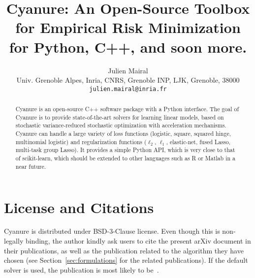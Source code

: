 \documentclass{article}
\title{Cyanure: An Open-Source Toolbox for Empirical Risk Minimization 
for Python, C++, and soon more.
}
\author{
Julien Mairal \\
   {Univ. Grenoble Alpes, Inria, CNRS, Grenoble INP, LJK, Grenoble, 38000}\\
         \texttt{julien.mairal@inria.fr}}
\begin{document}
\maketitle

\begin{abstract}
   Cyanure is an open-source C++ software package with a Python interface. 
   The goal of Cyanure is to provide state-of-the-art solvers for learning linear models,
   based on stochastic variance-reduced stochastic optimization with
   acceleration mechanisms.
   Cyanure can handle a large variety of loss functions (logistic, square,
   squared hinge, multinomial logistic) and regularization functions ($\ell_2$,
   $\ell_1$, elastic-net, fused Lasso, multi-task group Lasso).
   It provides a simple Python API, which is very close to that of scikit-learn,
   which should be extended to other languages such as R or Matlab in a near future.
\end{abstract}

\section{License and Citations}
Cyanure is distributed under BSD-3-Clause license. Even though this is non-legally binding, the author kindly ask users to cite the present arXiv document in their publications, as well as the publication related to the algorithm they have chosen (see Section~\ref{sec:formulations} for the related publications). If the default solver is used, the publication is most likely to be~\citep{lin2019inexact}.
\end{document}
